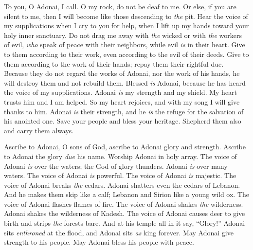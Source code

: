\begin{biblechapter} %
 To you, O Adonai, I call. 
O my rock, do not be deaf to me. 
Or else, if you are silent to me, 
then I will become like those descending to \textit{the} pit.
\verse Hear the voice of my supplications 
when I cry to you for help, 
when I lift up my hands 
toward your holy inner sanctuary.
\verse Do not drag me away with \textit{the} wicked 
or with \textit{the} workers of evil, 
\textit{who} speak of peace with their neighbors, 
while evil \textit{is} in their heart.
\verse Give to them according to their work, 
even according to the evil of their deeds. 
Give to them according to the work of their hands; 
repay them their rightful due.
\verse Because they do not regard the works of Adonai, 
nor the work of his hands, 
he will destroy them 
and not rebuild them.
\verse Blessed \textit{is} Adonai, 
because he has heard the voice of my supplications.
\verse Adonai \textit{is} my strength and my shield. 
My heart trusts him and I am helped. 
So my heart rejoices, 
and with my song I will give thanks to him.
\verse Adonai \textit{is} their strength, 
and he \textit{is} the refuge for the salvation of his anointed one.
\verse Save your people 
and bless your heritage. 
Shepherd them also and carry them always.
\end{biblechapter}

\begin{biblechapter} %
 Ascribe to Adonai, O sons of God, 
ascribe to Adonai glory and strength.
\verse Ascribe to Adonai the glory \textit{due} his name. 
Worship Adonai in holy array.
\verse The voice of Adonai \textit{is} over the waters; 
the God of glory thunders. 
Adonai \textit{is} over many waters.
\verse The voice of Adonai \textit{is} powerful. 
The voice of Adonai \textit{is} majestic.
\verse The voice of Adonai breaks \textit{the} cedars. 
Adonai shatters even the cedars of Lebanon.
\verse And he makes them skip like a calf; 
Lebanon and Sirion like a young wild ox.
\verse The voice of Adonai flashes flames of fire.
\verse The voice of Adonai shakes \textit{the} wilderness. 
Adonai shakes the wilderness of Kadesh.
\verse The voice of Adonai causes deer to give birth 
and strips \textit{the} forests bare. 
And at his temple all in it say, “Glory!”
\verse Adonai sits \textit{enthroned} at the flood, 
and Adonai sits \textit{as} king forever.
\verse May Adonai give strength to his people. 
May Adonai bless his people with peace.
\end{biblechapter}

